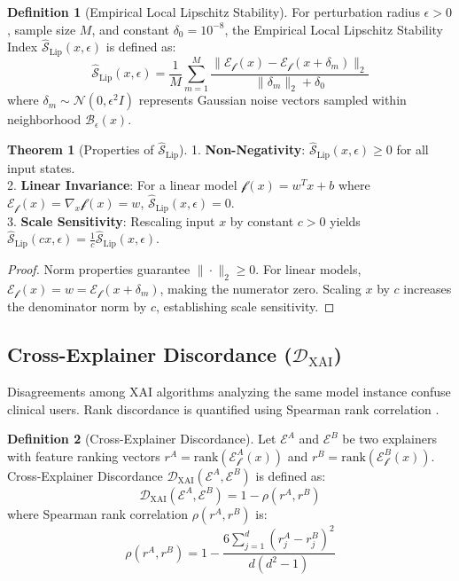 \documentclass[3p,times,procedia]{elsarticle}
\theoremstyle{definition}
\newtheorem{definition}{Definition}
\newtheorem{theorem}{Theorem}
\begin{document}
\begin{definition}[Empirical Local Lipschitz Stability]
For perturbation radius $\epsilon > 0$, sample size $M$, and constant $\delta_0 = 10^{-8}$, the Empirical Local Lipschitz Stability Index $\widehat{\mathcal{S}}_{\text{Lip}}(x, \epsilon)$ is defined as:
\begin{equation}
\widehat{\mathcal{S}}_{\text{Lip}}(x, \epsilon) = \frac{1}{M} \sum_{m=1}^M \frac{\|\mathcal{E}_{\mathcal{f}}(x) - \mathcal{E}_{\mathcal{f}}(x + \delta_m)\|_2}{\|\delta_m\|_2 + \delta_0}
\end{equation}
where $\delta_m \sim \mathcal{N}(0, \epsilon^2 I)$ represents Gaussian noise vectors sampled within neighborhood $\mathcal{B}_\epsilon(x)$.
\end{definition}

\begin{theorem}[Properties of $\widehat{\mathcal{S}}_{\text{Lip}}$]
1. \textbf{Non-Negativity}: $\widehat{\mathcal{S}}_{\text{Lip}}(x, \epsilon) \ge 0$ for all input states.\\
2. \textbf{Linear Invariance}: For a linear model $\mathcal{f}(x) = w^T x + b$ where $\mathcal{E}_{\mathcal{f}}(x) = \nabla_x \mathcal{f}(x) = w$, $\widehat{\mathcal{S}}_{\text{Lip}}(x, \epsilon) = 0$.\\
3. \textbf{Scale Sensitivity}: Rescaling input $x$ by constant $c > 0$ yields $\widehat{\mathcal{S}}_{\text{Lip}}(cx, \epsilon) = \frac{1}{c} \widehat{\mathcal{S}}_{\text{Lip}}(x, \epsilon)$.
\end{theorem}

\begin{proof}
Norm properties guarantee $\|\cdot\|_2 \ge 0$. For linear models, $\mathcal{E}_{\mathcal{f}}(x) = w = \mathcal{E}_{\mathcal{f}}(x + \delta_m)$, making the numerator zero. Scaling $x$ by $c$ increases the denominator norm by $c$, establishing scale sensitivity.
\end{proof}

\subsection{Cross-Explainer Discordance ($\mathcal{D}_{\text{XAI}}$)}
Disagreements among XAI algorithms analyzing the same model instance confuse clinical users. Rank discordance is quantified using Spearman rank correlation \cite{krishna2022disagreement}.

\begin{definition}[Cross-Explainer Discordance]
Let $\mathcal{E}^A$ and $\mathcal{E}^B$ be two explainers with feature ranking vectors $r^A = \text{rank}(\mathcal{E}^A_{\mathcal{f}}(x))$ and $r^B = \text{rank}(\mathcal{E}^B_{\mathcal{f}}(x))$. Cross-Explainer Discordance $\mathcal{D}_{\text{XAI}}(\mathcal{E}^A, \mathcal{E}^B)$ is defined as:
\begin{equation}
\mathcal{D}_{\text{XAI}}(\mathcal{E}^A, \mathcal{E}^B) = 1 - \rho(r^A, r^B)
\end{equation}
where Spearman rank correlation $\rho(r^A, r^B)$ is:
\begin{equation}
\rho(r^A, r^B) = 1 - \frac{6 \sum_{j=1}^d (r^A_j - r^B_j)^2}{d(d^2 - 1)}
\end{equation}
\end{definition}
\end{document}
